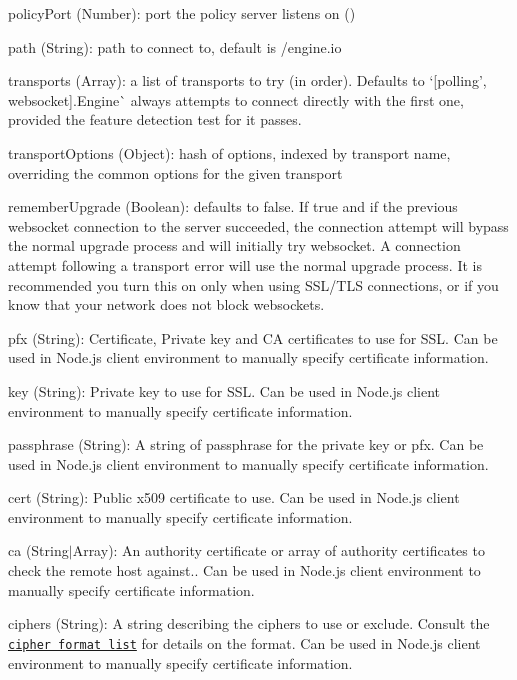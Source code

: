 \begin{DoxyItemize}
\begin{DoxyItemize}
\begin{DoxyItemize}
\item {\ttfamily policy\+Port} ({\ttfamily Number})\+: port the policy server listens on ({})
\item {\ttfamily path} ({\ttfamily String})\+: path to connect to, default is {\ttfamily /engine.io}
\item {\ttfamily transports} ({\ttfamily Array})\+: a list of transports to try (in order). Defaults to `\mbox{[}\textquotesingle{}polling', \textquotesingle{}websocket\textquotesingle{}\mbox{]}{\ttfamily .}Engine\`{} always attempts to connect directly with the first one, provided the feature detection test for it passes.
\item {\ttfamily transport\+Options} ({\ttfamily Object})\+: hash of options, indexed by transport name, overriding the common options for the given transport
\item {\ttfamily remember\+Upgrade} ({\ttfamily Boolean})\+: defaults to false. If true and if the previous websocket connection to the server succeeded, the connection attempt will bypass the normal upgrade process and will initially try websocket. A connection attempt following a transport error will use the normal upgrade process. It is recommended you turn this on only when using S\+S\+L/\+T\+LS connections, or if you know that your network does not block websockets.
\item {\ttfamily pfx} ({\ttfamily String})\+: Certificate, Private key and CA certificates to use for S\+SL. Can be used in Node.\+js client environment to manually specify certificate information.
\item {\ttfamily key} ({\ttfamily String})\+: Private key to use for S\+SL. Can be used in Node.\+js client environment to manually specify certificate information.
\item {\ttfamily passphrase} ({\ttfamily String})\+: A string of passphrase for the private key or pfx. Can be used in Node.\+js client environment to manually specify certificate information.
\item {\ttfamily cert} ({\ttfamily String})\+: Public x509 certificate to use. Can be used in Node.\+js client environment to manually specify certificate information.
\item {\ttfamily ca} ({\ttfamily String}$\vert${\ttfamily Array})\+: An authority certificate or array of authority certificates to check the remote host against.. Can be used in Node.\+js client environment to manually specify certificate information.
\item {\ttfamily ciphers} ({\ttfamily String})\+: A string describing the ciphers to use or exclude. Consult the \href{http://www.openssl.org/docs/apps/ciphers.html#CIPHER_LIST_FORMAT}{\tt cipher format list} for details on the format. Can be used in Node.\+js client environment to manually specify certificate information.

\end{DoxyItemize}
\end{DoxyItemize}
\end{DoxyItemize}
